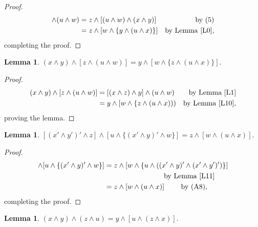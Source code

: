 \documentclass{amsart}
\theoremstyle{plain}
\newtheorem{lemma}[theorem]{Lemma}
\theoremstyle{problem}
\theoremstyle{definition}
\theoremstyle{remark}
\numberwithin{equation}{section}
\begin{document}
\begin{proof}
\begin{align*}
[(x \land y) \land z] \land (u \land w) &= z \land [(u \land w) \land (x \land y)] &\text{by (5)}   \\                                                          
                                                         &= z \land [w \land \{y \land (u \land x)\}] &\text{by Lemma \ref{L0}}, 
\end{align*}
completing the proof.
\end{proof}

\begin{lemma} \label{L11} 
 $ (x \land y) \land [z \land (u \land w)] = y \land [w \land \{z \land (u \land x)\}].$  %
\end{lemma}

\begin{proof}
\begin{align*}
 (x \land y) \land [z \land (u \land w)]&= [(x \land z) \land y] \land (u \land w)  &\text{by Lemma \ref{L1}}\\ %
                                                          &= y  \land [w \land \{z \land (u \land x))) &\text{by Lemma \ref{L10}}, %
\end{align*}
proving the lemma.
\end{proof}

\begin{lemma} \label{L12} 
 $[(x' \land y')' \land z] \land [u \land \{(x' \land y)' \land  w\}] = z \land [w \land (u \land x)].$  %
\end{lemma}

\begin{proof}
\begin{align*}
[(x' \land y')' \land z] \land [u \land \{(x' \land y)' \land  w\}]  &= z \land [w \land \{u \land ((x' \land y)' \land (x'  \land y')')\}] \\
                                                                         &\text{ \qquad \qquad \qquad \qquad by Lemma \ref{L11}}\\
                                                                 & = z \land [w \land (u \land x)] \text{\qquad \ by (A8)}, 
\end{align*}
completing the proof.\end{proof}


\begin{lemma} \label{L13} %
 $(x \land y) \land (z \land u) = y \land [u \land (z \land x)].$  %
\end{lemma}
\end{document}
